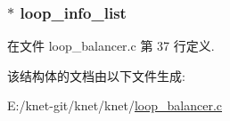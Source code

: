 \subsubsection[{loop\+\_\+info\+\_\+list}]{$\ast$ loop\+\_\+info\+\_\+list}\label{struct__loop__balancer__t_a155f9bd11162f8dd3610c1ca6222ba9d}


在文件 loop\+\_\+balancer.\+c 第 37 行定义.



该结构体的文档由以下文件生成\+:\begin{DoxyCompactItemize}
\item 
E\+:/knet-\/git/knet/knet/\hyperlink{loop__balancer_8c}{loop\+\_\+balancer.\+c}\end{DoxyCompactItemize}
